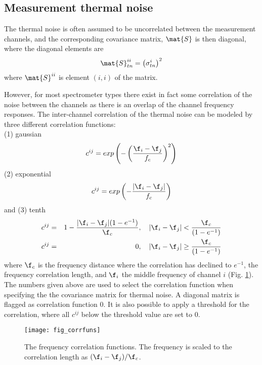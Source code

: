  \subsection{Measurement thermal noise}
 \label{sec:measerr:mtn}
 
 The thermal noise is often assumed to be uncorrelated between the
 measurement channels, and the corresponding covariance matrix,
 $\mat{S}$ is then diagonal, where the diagonal elements are
 \begin{equation}
   \mat{S}_{tn}^{ii} = \left( \sigma_{tn}^i \right)^2
  \label{eq:measerr:Stn_diag}
 \end{equation}
 where $\mat{S}^{ii}$ is element $(i,i)$ of the matrix.
 
 However, for most spectrometer types there exist in fact some
 correlation of the noise between the channels as there is an overlap
 of the channel frequency responses.  The inter-channel correlation of
 the thermal noise can be modeled by three
 different correlation functions: \\ \noindent (1) gaussian
 \begin{equation}
  c^{ij} = exp\left(-\left(\frac{\f_i-\f_j}{f_c}\right)^2\right)
 \end{equation}
 (2) exponential
 \begin{equation}
  c^{ij} = exp\left(-\frac{|\f_i-\f_j|}{f_c}\right)
 \end{equation}
 and (3) tenth
 \begin{eqnarray}
  c^{ij} &=& 1-\frac{|\f_i-\f_j|(1-e^{-1})}{\f_c}, \quad 
            |\f_i-\f_j| < \frac{\f_c}{(1-e^{-1})} \nonumber \\
  c^{ij} &=& 0, \quad |\f_i-\f_j| \geq \frac{\f_c}{(1-e^{-1})}
 \end{eqnarray}
 where $\f_c$ is the frequency distance where the correlation has
 declined to $e^{-1}$, the frequency correlation length, and $\f_i$
 the middle frequency of channel $i$ (Fig. \ref{fig:measerr:cfuns}).
 The numbers given above are used to select the correlation function
 when specifying the the covariance matrix for thermal noise. A
 diagonal matrix is flagged as correlation function 0. It is also
 possible to apply a threshold for the correlation, where all $c^{ij}$
 below the threshold value are set to 0.

 \begin{figure}
  \begin{center}
   \begin{minipage}[c]{0.65\textwidth}
    \centering
    \texttt{[image: fig\_corrfuns]}
   \end{minipage}%
   \hspace{0.03\textwidth}%
   \begin{minipage}[c]{0.30\textwidth}
    \centering
    \caption{The frequency correlation functions. The frequency is scaled to
             the correlation length as $(\f_i-\f_j)/\f_c$.}
    \label{fig:measerr:cfuns}
   \end{minipage}
  \end{center}
 \end{figure}           
 
